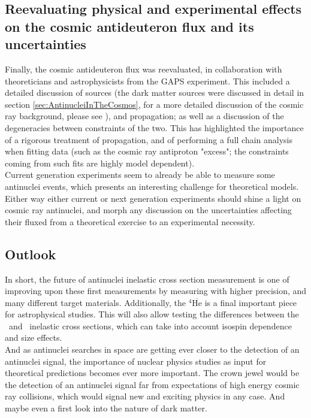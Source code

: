 \subsection{Reevaluating physical and experimental effects on the cosmic antideuteron flux and its uncertainties}

Finally, the cosmic antideuteron flux was reevaluated, in collaboration with theoreticians and astrophysicists from the GAPS experiment. This included a detailed discussion of sources (the dark matter sources were discussed in detail in section \ref{sec:AntinucleiInTheCosmos}, for a more detailed discussion of the cosmic ray background, please see \cite{Serksnyte:2022onw}), and propagation; as well as a discussion of the degeneracies between constraints of the two. This has highlighted the importance of a rigorous treatment of propagation, and of performing a full chain analysis when fitting data (such as the cosmic ray antiproton "excess"; the constraints coming from such fits are highly model dependent). \\

Current generation experiments seem to already be able to measure some antinuclei events, which presents an interesting challenge for theoretical models. Either way either current or next generation experiments should shine a light on cosmic ray antinuclei, and morph any discussion on the uncertainties affecting their fluxed from a theoretical exercise to an experimental necessity. 

\subsection{Outlook}

In short, the future of antinuclei inelastic cross section measurement is one of improving upon these first measurements by measuring with higher precision, and many different target materials. Additionally, the $^4\overline{\mathrm{He}}$ is a final important piece for astrophysical studies. This will also allow testing the differences between the \ahe\ and \atrit\ inelastic cross sections, which can take into account isospin dependence and size effects.  \\

And as antinuclei searches in space are getting ever closer to the detection of an antinuclei signal, the importance of nuclear physics studies as input for theoretical predictions becomes ever more important. The crown jewel would be the detection of an antinuclei signal far from expectations of high energy cosmic ray collisions, which would signal new and exciting physics in any case. And maybe even a first look into the nature of dark matter. 